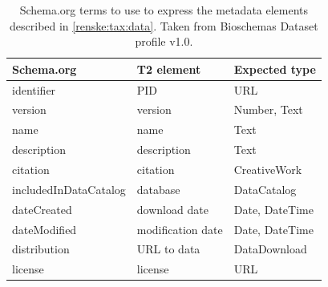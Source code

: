 \begin{table}[bt!]
\caption{Schema.org terms to use to express the metadata elements described in \ref{renske:tax:data}. Taken from Bioschemas Dataset profile v1.0.}\label{tab:renske:dataset_bioschemas}
\begin{tabularx}{\linewidth}{l l L}
\toprule
Schema.org & T2 element & Expected type \\
\midrule
        identifier & PID & URL \\ %
        version & version & Number, Text \\ %
        name & name & Text \\ %
        description & description & Text \\ %
        citation & citation & CreativeWork \\ %
        includedInDataCatalog & database & DataCatalog \\ %
        dateCreated & download date & Date, DateTime \\ %
        dateModified & modification date & Date, DateTime \\ %
        distribution & URL to data & DataDownload \\ %
        license & license & URL \\ %
\bottomrule
\end{tabularx}
\end{table}
